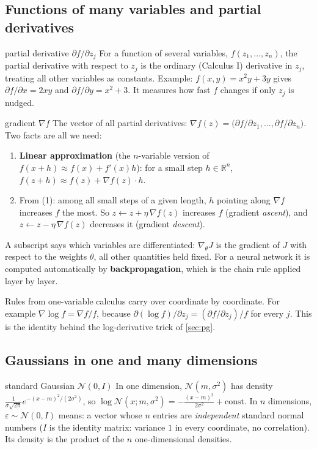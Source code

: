 \documentclass[11pt,a4paper]{article}
\newcommand{\R}{\mathbb{R}}
\newcommand{\N}{\mathcal{N}}
\begin{document}
\subsection{Functions of many variables and partial derivatives}
\begin{newc}{partial derivative $\partial f/\partial z_j$}
For a function of several variables, $f(z_1,\dots,z_n)$, the partial derivative with respect to $z_j$ is the ordinary (Calculus I) derivative in $z_j$, treating all other variables as constants. Example: $f(x,y)=x^2y+3y$ gives $\partial f/\partial x=2xy$ and $\partial f/\partial y=x^2+3$. It measures how fast $f$ changes if only $z_j$ is nudged.
\end{newc}
\begin{newc}{gradient $\nabla f$}
The vector of all partial derivatives: $\nabla f(z)=\big(\partial f/\partial z_1,\dots,\partial f/\partial z_n\big)$. Two facts are all we need:
\begin{enumerate}[leftmargin=*]
\item \textbf{Linear approximation} (the $n$-variable version of $f(x+h)\approx f(x)+f'(x)h$): for a small step $h\in\R^n$, $f(z+h)\approx f(z)+\nabla f(z)\cdot h$.
\item From (1): among all small steps of a given length, $h$ pointing along $\nabla f$ increases $f$ the most. So $z\leftarrow z+\eta\,\nabla f(z)$ increases $f$ (gradient \emph{ascent}), and $z\leftarrow z-\eta\,\nabla f(z)$ decreases it (gradient \emph{descent}).
\end{enumerate}
A subscript says which variables are differentiated: $\nabla_\theta J$ is the gradient of $J$ with respect to the weights $\theta$, all other quantities held fixed. For a neural network it is computed automatically by \textbf{backpropagation}, which is the chain rule applied layer by layer.
\end{newc}
Rules from one-variable calculus carry over coordinate by coordinate. For example $\nabla\log f=\nabla f/f$, because $\partial(\log f)/\partial z_j=(\partial f/\partial z_j)/f$ for every $j$. This is the identity behind the log-derivative trick of \cref{sec:pg}.

\subsection{Gaussians in one and many dimensions}
\begin{newc}{standard Gaussian $\N(0,I)$}
In one dimension, $\N(m,\sigma^2)$ has density $\frac{1}{\sigma\sqrt{2\pi}}e^{-(x-m)^2/(2\sigma^2)}$, so $\log\N(x;m,\sigma^2)=-\frac{(x-m)^2}{2\sigma^2}+\text{const}$. In $n$ dimensions, $\varepsilon\sim\N(0,I)$ means: a vector whose $n$ entries are \emph{independent} standard normal numbers ($I$ is the identity matrix: variance $1$ in every coordinate, no correlation). Its density is the product of the $n$ one-dimensional densities.
\end{newc}
\end{document}
